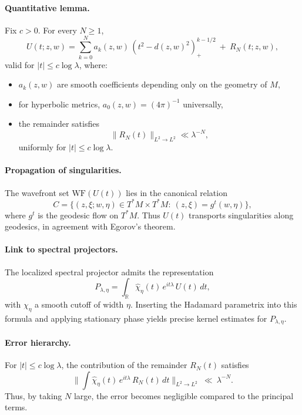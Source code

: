 \paragraph{Quantitative lemma.}
\begin{lemma}\label{lem:C1-hadamard}
Fix $c>0$. For every $N\ge 1$,
\[
U(t;z,w) = \sum_{k=0}^N a_k(z,w)\,(t^2-d(z,w)^2)_+^{k-1/2}
\ +\ R_N(t;z,w),
\]
valid for $|t|\le c\log \lambda$, where:
\begin{itemize}
  \item $a_k(z,w)$ are smooth coefficients depending only on the geometry of $M$,
  \item for hyperbolic metrics, $a_0(z,w)=(4\pi)^{-1}$ universally,
  \item the remainder satisfies
  \[
  \|R_N(t)\|_{L^2\to L^2} \ll \lambda^{-N},
  \]
  uniformly for $|t|\le c\log \lambda$.
\end{itemize}
\end{lemma}

\paragraph{Propagation of singularities.}
\begin{corollary}\label{cor:C1-wavefront}
The wavefront set $\mathrm{WF}(U(t))$ lies in the canonical relation
\[
C = \{(z,\xi;w,\eta)\in T^*M\times T^*M:\ (z,\xi)=g^t(w,\eta)\},
\]
where $g^t$ is the geodesic flow on $T^*M$. Thus $U(t)$ transports singularities
along geodesics, in agreement with Egorov’s theorem.
\end{corollary}

\paragraph{Link to spectral projectors.}
The localized spectral projector admits the representation
\[
P_{\lambda,\eta} = \int_{\mathbb{R}} \widehat{\chi}_\eta(t)\, e^{it\lambda}\, U(t)\,dt,
\]
with $\chi_\eta$ a smooth cutoff of width $\eta$.
Inserting the Hadamard parametrix into this formula and applying stationary phase
yields precise kernel estimates for $P_{\lambda,\eta}$.

\paragraph{Error hierarchy.}
For $|t|\le c\log \lambda$, the contribution of the remainder $R_N(t)$ satisfies
\[
\Big\|\int \widehat{\chi}_\eta(t)\, e^{it\lambda}\, R_N(t)\,dt\Big\|_{L^2\to L^2}
\ \ll\ \lambda^{-N}.
\]
Thus, by taking $N$ large, the error becomes negligible compared to the principal terms.

